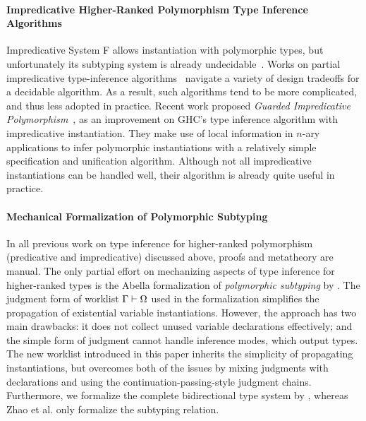 \paragraph{Impredicative Higher-Ranked Polymorphism Type Inference Algorithms}
Impredicative System F allows instantiation with polymorphic types,
but unfortunately its subtyping system is already undecidable~\cite{tiuryn1996subtyping}.
Works on partial impredicative type-inference algorithms~\cite{le2003ml,leijen2008hmf,vytiniotis2008fph}
navigate a variety of design tradeoffs for a decidable algorithm.
As a result, such algorithms tend to be more complicated, and thus less adopted in practice.
Recent work proposed \emph{Guarded Impredicative Polymorphism}~\cite{Serrano2018},
as an improvement on GHC's type inference algorithm with impredicative instantiation.
They make use of local information in $n$-ary applications to
infer polymorphic instantiations with a relatively simple specification and unification algorithm.
Although not all impredicative instantiations can be handled well,
their algorithm is already quite useful in practice.

\paragraph{Mechanical Formalization of Polymorphic Subtyping}
In all previous work on type inference for higher-ranked polymorphism
(predicative and impredicative) discussed above, proofs and
metatheory are manual. The only partial effort on mechanizing aspects of type inference
for higher-ranked types is
the Abella formalization of \emph{polymorphic subtyping} by \citet{itp2018}.
The judgment form of worklist $\Gamma \vdash \Omega$ used in the formalization simplifies
the propagation of existential variable instantiations.
However, the approach has two main drawbacks:
it does not collect unused variable declarations effectively;
and the simple form of judgment cannot handle inference modes, which output types.
The new worklist introduced in this paper inherits the simplicity of propagating instantiations,
but overcomes both of the issues by mixing judgments with declarations
and using the continuation-passing-style judgment chains. Furthermore,
we formalize the complete bidirectional type system by
\citet{dunfield2013complete}, whereas Zhao et al. only formalize
the subtyping relation. 


